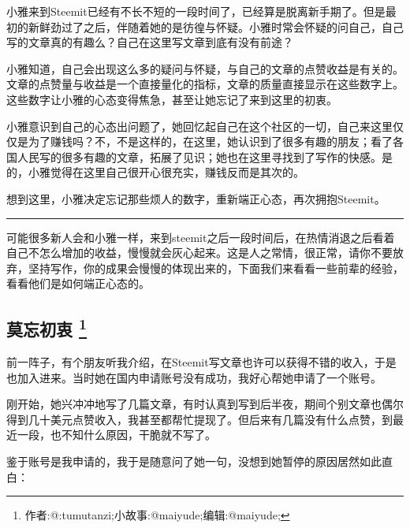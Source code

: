 \documentclass[]{ctexbook}
\begin{document}
小雅来到Steemit已经有不长不短的一段时间了，已经算是脱离新手期了。但是最初的新鲜劲过了之后，伴随着她的是彷徨与怀疑。小雅时常会怀疑的问自己，自己写的文章真的有趣么？自己在这里写文章到底有没有前途？

小雅知道，自己会出现这么多的疑问与怀疑，与自己的文章的点赞收益是有关的。文章的点赞量与收益是一个直接量化的指标，文章的质量直接显示在这些数字上。这些数字让小雅的心态变得焦急，甚至让她忘记了来到这里的初衷。

小雅意识到自己的心态出问题了，她回忆起自己在这个社区的一切，自己来这里仅仅是为了赚钱吗？不，不是这样的，在这里，她认识到了很多有趣的朋友；看了各国人民写的很多有趣的文章，拓展了见识；她也在这里寻找到了写作的快感。是的，小雅觉得在这里自己很开心很充实，赚钱反而是其次的。

想到这里，小雅决定忘记那些烦人的数字，重新端正心态，再次拥抱Steemit。

\begin{center}\rule{0.5\linewidth}{\linethickness}\end{center}

可能很多新人会和小雅一样，来到steemit之后一段时间后，在热情消退之后看着自己不怎么增加的收益，慢慢就会灰心起来。这是人之常情，很正常，请你不要放弃，坚持写作，你的成果会慢慢的体现出来的，下面我们来看看一些前辈的经验，看看他们是如何端正心态的。

\subsection[莫忘初衷 ]{\texorpdfstring{莫忘初衷 \footnote{作者:@:tumutanzi;小故事:@maiyude;编辑:@maiyude;}}{莫忘初衷 }}

前一阵子，有个朋友听我介绍，在Steemit写文章也许可以获得不错的收入，于是也加入进来。当时她在国内申请账号没有成功，我好心帮她申请了一个账号。

刚开始，她兴冲冲地写了几篇文章，有时认真到写到后半夜，期间个别文章也偶尔得到几十美元点赞收入，我甚至都帮忙提现了。但后来有几篇没有什么点赞，到最近一段，也不知什么原因，干脆就不写了。

鉴于账号是我申请的，我于是随意问了她一句，没想到她暂停的原因居然如此直白：
\end{document}
